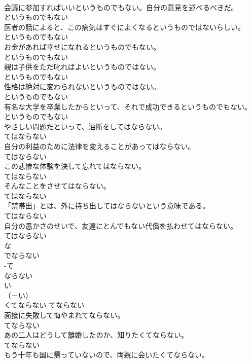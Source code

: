 \documentclass[8pt]{extreport}
\begin{document}
\begin{CJK}{UTF8}{min}
\\	会議に参加すればいいというものでもない。自分の意見を述べるべきだ。	
\\	というものでもない
\\	医者の話によると、この病気はすぐによくなるというものではないらしい。	
\\	というものでもない
\\	お金があれば幸せになれるというものでもない。	
\\	というものでもない
\\	親は子供をただ叱ればよいというものではない。	
\\	というものでもない
\\	性格は絶対に変わられないというものではない。	
\\	というものでもない
\\	有名な大学を卒業したからといって、それで成功できるというものでもない。	
\\	というものでもない
\\	やさしい問題だといって、油断をしてはならない。	
\\	てはならない
\\	自分の利益のために法律を変えることがあってはならない。	
\\	てはならない
\\	この悲惨な体験を決して忘れてはならない。	
\\	てはならない
\\	そんなことをさせてはならない。	
\\	てはならない
\\	「禁帯出」とは、外に持ち出してはならないという意味である。	
\\	てはならない
\\	自分の愚かさのせいで、友達にとんでもない代償を払わせてはならない。	
\\	てはならない
\\	な
\\	でならない	
\\	-て
\\	ならない	
\\	い
\\	（－い） 
\\	くてならない	てならない
\\	面接に失敗して悔やまれてならない。	
\\	てならない
\\	あの二人はどうして離婚したのか、知りたくてならない。	
\\	てならない
\\	もう十年も国に帰っていないので、両親に会いたくてならない。	

\end{CJK}
\end{document}
